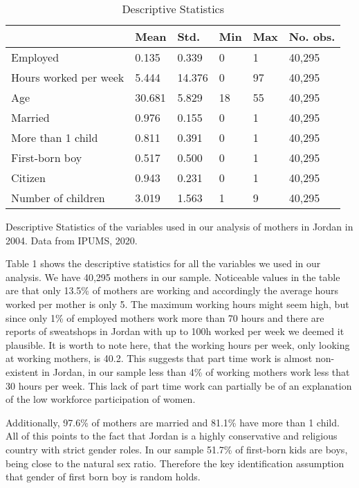 \documentclass[12pt,draft,a4paper]{article}
\begin{document}
\begin{table}[ht]
    \caption{Descriptive Statistics}
    \begin{tabularx}{\textwidth}{lXXXXX}
    \hline
                          & Mean   & Std.   & Min & Max & No. obs. \\ \hline
    Employed              & 0.135  & 0.339  & 0   & 1   & 40,295   \\
    Hours worked per week & 5.444  & 14.376 & 0   & 97  & 40,295   \\
    Age                   & 30.681 & 5.829  & 18  & 55  & 40,295   \\
    Married               & 0.976  & 0.155  & 0   & 1   & 40,295   \\
    More than 1 child     & 0.811  & 0.391  & 0   & 1   & 40,295   \\
    First-born boy        & 0.517  & 0.500  & 0   & 1   & 40,295   \\
    Citizen               & 0.943  & 0.231  & 0   & 1   & 40,295   \\
    Number of children    & 3.019  & 1.563  & 1   & 9   & 40,295   \\ \hline
    \end{tabularx}%

    Descriptive Statistics of the variables used in our analysis of mothers in Jordan in 2004. Data from IPUMS, 2020.
    \label{tab:desc}
    \end{table}

Table 1 shows the descriptive statistics for all the variables we used in our analysis. We have 40,295 mothers in our sample.
Noticeable values in the table are that only 13.5\% of mothers are working and accordingly the average hours worked per mother is only 5.
The maximum working hours might seem high,
but since only 1\% of employed mothers work more than 70 hours and there are reports of sweatshops in Jordan with up to 100h worked per week \citep{NYT06} we deemed it plausible.
It is worth to note here, that the working hours per week, only looking at working mothers, is 40.2.
This suggests that part time work is almost non-existent in Jordan, in our sample less than 4\% of working mothers work less that 30 hours per week.
This lack of part time work can partially be of an explanation of the low workforce participation of women. 

Additionally, 97.6\% of mothers are married and 81.1\% have more than 1 child.
All of this points to the fact that Jordan is a highly conservative and religious country with strict gender roles.
In our sample 51.7\% of first-born kids are boys, being close to the natural sex ratio. Therefore the key identification assumption that gender of first born boy is random holds.
    
\end{document}
